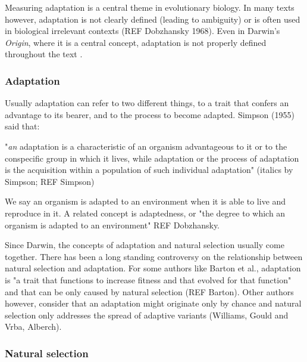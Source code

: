 Measuring adaptation is a central theme in evolutionary biology. In many texts however, adaptation is not clearly defined (leading to ambiguity) or is often used in biological irrelevant contexts (REF Dobzhansky 1968). 
Even in Darwin's \textit{Origin}, where it is a central concept, adaptation is not properly defined throughout the text \citep{darwin1859origin}.
\subsubsection{Adaptation}

Usually adaptation can refer to two different things, to a trait that confers an advantage to its bearer, and to the process to become adapted.
Simpson (1955) said that: 

"\textit{an} adaptation is a characteristic of an organism advantageous to it or to the conspecific group in which it lives, while adaptation or the process of adaptation is the acquisition within a population of such individual adaptation" (italics by Simpson; REF Simpson)

We say an organism is adapted to an environment when it is able to live and reproduce in it. A related concept is adaptedness, or "the degree to which an organism is adapted to an environment" REF Dobzhansky.
%

Since Darwin, the concepts of adaptation and natural selection usually come together. There has been a long standing controversy on the relationship between natural selection and adaptation.
For some authors like Barton et al., adaptation is "a trait that functions to increase fitness and that evolved for that function" and that can be only caused by natural selection (REF Barton).
Other authors however, consider that an adaptation might originate only by chance and natural selection only addresses the spread of adaptive variants (Williams, Gould and Vrba, Alberch).


\subsubsection{Natural selection}

